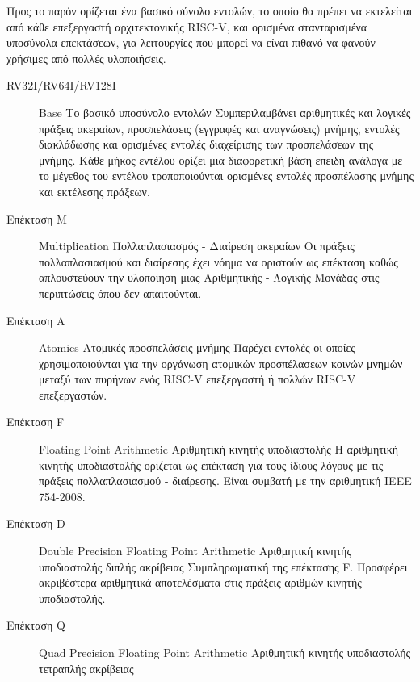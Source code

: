 \documentclass[11pt]{extarticle}
\begin{document}
Προς το παρόν ορίζεται ένα βασικό σύνολο εντολών, το οποίο θα πρέπει να εκτελείται από κάθε επεξεργαστή αρχιτεκτονικής RISC-V, και ορισμένα στανταρισμένα υποσύνολα επεκτάσεων, για λειτουργίες που μπορεί να είναι πιθανό να φανούν χρήσιμες από πολλές υλοποιήσεις.
\begin{description}
    \item[RV32I/RV64I/RV128I] Base \newline
Το βασικό υποσύνολο εντολών \newline
Συμπεριλαμβάνει αριθμητικές και λογικές πράξεις ακεραίων, προσπελάσεις (εγγραφές και αναγνώσεις) μνήμης, εντολές διακλάδωσης και ορισμένες εντολές διαχείρισης των προσπελάσεων της μνήμης.
Κάθε μήκος εντέλου ορίζει μια διαφορετική βάση επειδή ανάλογα με το μέγεθος του εντέλου τροποποιούνται ορισμένες εντολές προσπέλασης μνήμης και εκτέλεσης πράξεων.
    \item[Επέκταση Μ] Multiplication \newline 
Πολλαπλασιασμός - Διαίρεση ακεραίων \newline
Οι πράξεις πολλαπλασιασμού και διαίρεσης έχει νόημα να οριστούν ως επέκταση καθώς απλουστεύουν την υλοποίηση μιας Αριθμητικής - Λογικής Μονάδας στις περιπτώσεις όπου δεν απαιτούνται.
    \item[Επέκταση Α] Atomics \newline
Ατομικές προσπελάσεις μνήμης \newline
Παρέχει εντολές οι οποίες χρησιμοποιούνται για την οργάνωση ατομικών προσπέλασεων κοινών μνημών μεταξύ των πυρήνων ενός RISC-V επεξεργαστή ή πολλών RISC-V επεξεργαστών.
    \item[Επέκταση F] Floating Point Arithmetic \newline
Αριθμητική κινητής υποδιαστολής \newline
Η αριθμητική κινητής υποδιαστολής ορίζεται ως επέκταση για τους ίδιους λόγους με τις πράξεις πολλαπλασιασμού - διαίρεσης.
Είναι συμβατή με την αριθμητική IEEE 754-2008.
    \item[Επέκταση D] Double Precision Floating Point Arithmetic \newline
Αριθμητική κινητής υποδιαστολής διπλής ακρίβειας \newline
Συμπληρωματική της επέκτασης F.
Προσφέρει ακριβέστερα αριθμητικά αποτελέσματα στις πράξεις αριθμών κινητής υποδιαστολής.
    \item[Επέκταση Q] Quad Precision Floating Point Arithmetic \newline 
Αριθμητική κινητής υποδιαστολής τετραπλής ακρίβειας \newline

\end{description}
\end{document}
